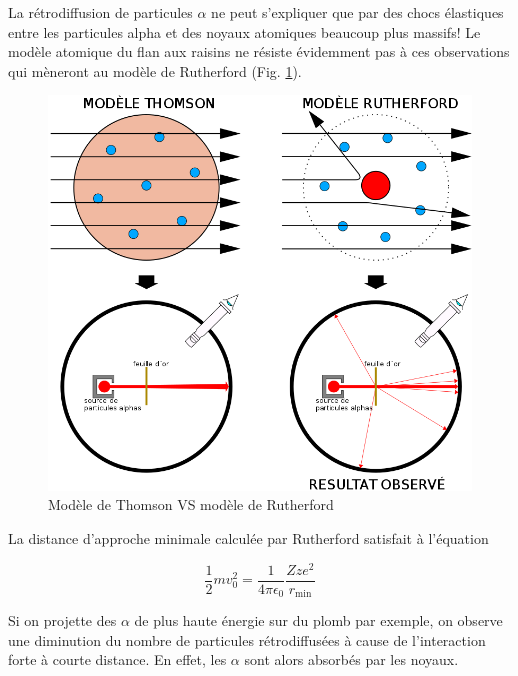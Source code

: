 La rétrodiffusion de particules $\alpha$ ne peut s’expliquer que par des chocs élastiques entre les particules alpha et des noyaux atomiques beaucoup plus massifs! Le modèle atomique du flan aux raisins ne résiste évidemment pas à ces observations qui mèneront au modèle de Rutherford (Fig. \ref{fig:mod_rutherford}).
\begin{figure}[ht]
    \centering
    \includegraphics[scale=0.25]{Images1/thom_ruth.png}
    \caption{Modèle de Thomson VS modèle de Rutherford}
    \label{fig:mod_rutherford}
\end{figure}
La distance d'approche minimale calculée par Rutherford satisfait à l'équation

$$\dfrac{1}{2}mv_0^2=\dfrac{1}{4\pi\epsilon_0}\dfrac{Zze^2}{r_\text{min}}$$

Si on projette des $\alpha$ de plus haute énergie sur du plomb par exemple, on observe une diminution du nombre de particules rétrodiffusées à cause de l'interaction forte à courte distance. En effet, les $\alpha$ sont alors absorbés par les noyaux.

